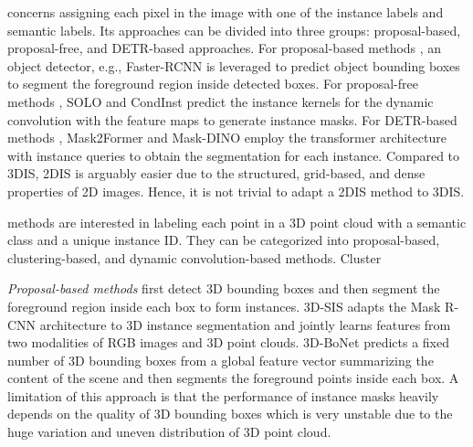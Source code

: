 \documentclass[10pt,twocolumn,letterpaper]{article}
\begin{document}
 concerns assigning each pixel in the image with one of the instance labels and semantic labels. Its approaches can be divided into three groups: proposal-based, proposal-free, and DETR-based approaches. For proposal-based methods \cite{he2017mask,Cai2018CascadeRD,kirillov2020pointrend}, an object detector, e.g., Faster-RCNN \cite{ren2015fasterrcnn} is leveraged to predict object bounding boxes to segment the foreground region inside detected boxes.
For proposal-free methods \cite{wang2020solo,wang2020solov2,tian2020conditional}, SOLO \cite{wang2020solo,wang2020solov2} and CondInst \cite{tian2020conditional} predict the instance kernels for the dynamic convolution with the feature maps to generate instance masks. For DETR-based methods \cite{guo2021sotr,Cheng2021PerPixelCI,Cheng2022MaskedattentionMT,li2022mask}, Mask2Former \cite{Cheng2022MaskedattentionMT} and Mask-DINO \cite{li2022mask} employ the transformer architecture with instance queries to obtain the segmentation for each instance. 
Compared to 3DIS, 2DIS is arguably easier due to the structured, grid-based, and dense properties of 2D images. Hence, it is not trivial to adapt a 2DIS method to 3DIS.


 methods are interested in labeling each point in a 3D point cloud with a semantic class and a unique instance ID. They can be categorized into proposal-based, clustering-based, and dynamic convolution-based methods. Cluster

\textit{Proposal-based methods} \cite{hou20193d,yang2019learning,yi2019gspn} first detect 3D bounding boxes and then segment the foreground region inside each box to form instances. 3D-SIS \cite{hou20193d} adapts the Mask R-CNN architecture to 3D instance segmentation and jointly learns features from two modalities of RGB images and 3D point clouds. 
3D-BoNet \cite{yang2019learning} predicts a fixed number of 3D bounding boxes from a global feature vector summarizing the content of the scene and then segments the foreground points inside each box. 
A limitation of this approach is that the performance of instance masks heavily depends on the quality of 3D bounding boxes which is very unstable due to the huge variation and uneven distribution of 3D point cloud.
% 
% 
\end{document}
